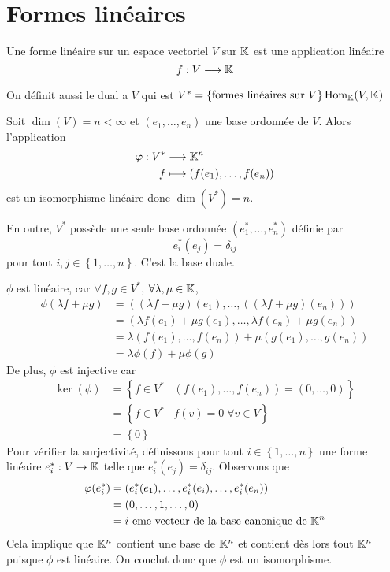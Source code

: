 \section{Formes linéaires}
\begin{definition}
  Une forme linéaire sur un espace vectoriel $V$ sur $\mathbb{K}$ est une application linéaire $$f: V \longrightarrow \mathbb{K}$$
\end{definition}
On définit aussi le dual a $V$ qui est $V^* = \left\{ \text{formes linéaires sur } V \right\} \mathrm{Hom}_{\mathbb{K}}(V, \mathbb{K})$
\begin{theoreme}\label{thm:dual}
  Soit $\dim(V) = n < \infty$ et $(e_1, \dots, e_n)$ une base ordonnée de $V$. Alors l'application
  \begin{align*}
    \varphi: V^* &\longrightarrow \mathbb{K}^n \\
    f &\longmapsto \left(f(e_1), \dots, f(e_n)\right)
  \end{align*}
  est un isomorphisme linéaire donc $\dim(V^*) = n$.
  \par En outre, $V^*$ possède une seule base ordonnée $(e^*_1, \dots, e^*_n)$ définie par $$e^*_i(e_j) = \delta_{ij}$$ pour tout $i, j \in \left\{ 1, \dots, n \right\}$. C'est la base duale.
  \tcblower
  \begin{preuve}
    $\phi$ est linéaire, car $\forall f, g \in V^*$, $\forall \lambda, \mu \in \mathbb{K}$,
    \begin{align*}
      \phi(\lambda f + \mu g) &= \left( (\lambda f + \mu g)(e_1), \dots, \left( (\lambda f + \mu g)(e_n) \right) \right) \\
                              &= \left( \lambda f(e_1) + \mu g(e_1), \dots, \lambda f(e_n) + \mu g(e_n) \right) \\
                              &= \lambda \left( f(e_1), \dots, f(e_n) \right) + \mu \left( g(e_1), \dots, g(e_n) \right) \\
                              &= \lambda \phi(f) + \mu \phi(g)
    \end{align*}
    De plus, $\phi$ est injective car
    \begin{align*}
      \ker(\phi) &= \left\{ f \in V^* \mid (f(e_1), \dots, f(e_n)) = (0, \dots, 0) \right\} \\
                 &= \left\{ f \in V^* \mid f(v) = 0 \; \forall v \in V \right\} \\
                 &= \left\{  0\right\}
    \end{align*}
    Pour vérifier la surjectivité, définissons pour tout $i \in \left\{ 1, \dots, n \right\}$ une forme linéaire $e^*_i: V \rightarrow \mathbb{K}$ telle que $e^*_i(e_j) = \delta_{ij}$. Observons que
    \begin{align*}
      \varphi(e^*_i) &= (e^*_i(e_1), \dots, e^*_i(e_i), \dots, e^*_i(e_n)) \\
                  &= (0, \dots, 1, \dots, 0) \\
                  &= i\text{-eme vecteur de la base canonique de } \mathbb{K}^n
    \end{align*}
    Cela implique que $\mathbb{K}^n$ contient une base de $\mathbb{K}^n$ et contient dès lors tout $\mathbb{K}^n$ puisque $\phi$ est linéaire. On conclut donc que $\phi$ est un isomorphisme.
  \end{preuve}


\end{theoreme}
